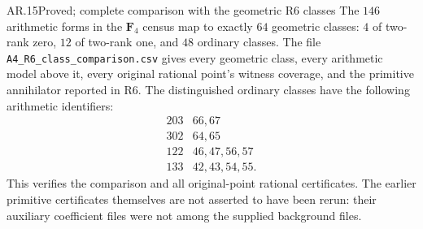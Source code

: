 \begin{claim}{AR.15}{Proved; complete comparison with the geometric R6 classes}
The $146$ arithmetic forms in the $\mathbf F_4$ census map to
exactly $64$ geometric classes: $4$ of two-rank zero, $12$ of
two-rank one, and $48$ ordinary classes. The file
\texttt{A4\_R6\_class\_comparison.csv} gives every geometric class,
every arithmetic model above it, every original rational point's
witness coverage, and the primitive annihilator reported in R6.
The distinguished ordinary classes have the following arithmetic
identifiers:
\[
\begin{array}{c|l}
203&66,67\\
302&64,65\\
122&46,47,56,57\\
133&42,43,54,55.
\end{array}
\]
This verifies the comparison and all original-point rational
certificates. The earlier primitive certificates themselves are
not asserted to have been rerun: their auxiliary coefficient files
were not among the supplied background files.
\end{claim}
